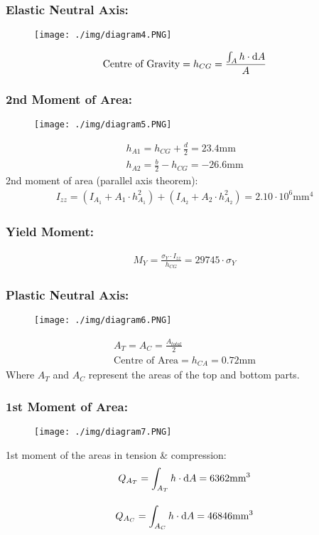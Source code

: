 \subsubsection{Elastic Neutral Axis:}
\begin{figure}[H]
  \centering
  \texttt{[image: ./img/diagram4.PNG]}
\end{figure}
\begin{gather}
  \text{Centre of Gravity} = h_{CG} = \frac{\int_{A}h\cdot\dif A}{A}
\end{gather}
\subsubsection{2nd Moment of Area:}
\begin{figure}[H]
  \centering
  \texttt{[image: ./img/diagram5.PNG]}
\end{figure}
\begin{gather}
  h_{A1} = h_{CG}+\frac{d}{2} = 23.4 \text{mm} \\
  h_{A2} = \frac{b}{2}-h_{CG} = -26.6 \text{mm}
\end{gather}
2nd moment of area (parallel axis theorem):
\begin{gather}
  I_{zz} = (I_{A_1}+A_1\cdot h_{A_1}^2)+(I_{A_2}+A_2\cdot h_{A_2}^2) = 2.10\cdot 10^6 \text{mm}^4
\end{gather}
\subsubsection{Yield Moment:}
\begin{gather}
  M_Y = \frac{\sigma_Y \cdot I_{zz}}{h_{CG}} = 29745\cdot\sigma_Y
\end{gather}
\subsubsection{Plastic Neutral Axis:}
\begin{figure}[H]
  \centering
  \texttt{[image: ./img/diagram6.PNG]}
\end{figure}
\begin{gather}
  A_T = A_C = \frac{A_{total}}{2} \\[10pt]
  \text{Centre of Area} = h_{CA} = 0.72\text{mm}
\end{gather}
Where $A_T$ and $A_C$ represent the areas of the top and bottom parts.
\subsubsection{1st Moment of Area:}
\begin{figure}[H]
  \centering
  \texttt{[image: ./img/diagram7.PNG]}
\end{figure}
1st moment of the areas in tension \& compression:
\begin{gather}
  Q_{A_T} = \int_{A_T}h\cdot\dif A = 6362\text{mm}^3 \\[10pt]
  Q_{A_C} = \int_{A_C}h\cdot\dif A = 46846\text{mm}^3
\end{gather}
